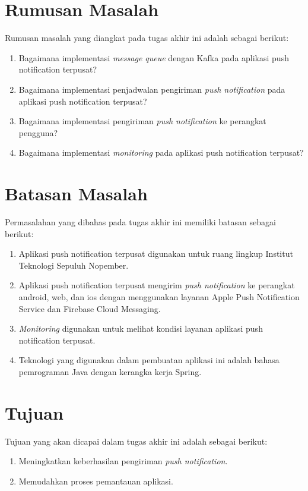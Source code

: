 \section {Rumusan Masalah}
Rumusan masalah yang diangkat pada tugas akhir ini adalah sebagai berikut:
\begin {enumerate}
\item Bagaimana implementasi \textit{message queue} dengan Kafka pada aplikasi push notification terpusat?
\item Bagaimana implementasi penjadwalan pengiriman \textit{push notification} pada aplikasi push notification terpusat?
\item Bagaimana implementasi pengiriman \textit{push notification} ke perangkat pengguna?
\item Bagaimana implementasi \textit{monitoring} pada aplikasi push notification terpusat?
\end {enumerate}

\section {Batasan Masalah}
Permasalahan yang dibahas pada tugas akhir ini memiliki batasan sebagai berikut:
\begin {enumerate}
\item Aplikasi push notification terpusat digunakan untuk ruang lingkup Institut Teknologi Sepuluh Nopember.
\item Aplikasi push notification terpusat mengirim \textit{push notification} ke perangkat android, web, dan ios dengan menggunakan layanan Apple Push Notification Service dan Firebase Cloud Messaging.
\item \textit{Monitoring} digunakan untuk melihat kondisi layanan aplikasi push notification terpusat.
\item Teknologi yang digunakan dalam pembuatan aplikasi ini adalah bahasa pemrograman Java dengan kerangka kerja Spring.
\end {enumerate}

\section {Tujuan}
Tujuan yang akan dicapai dalam tugas akhir ini adalah sebagai berikut:
\begin{enumerate}
	\item Meningkatkan keberhasilan pengiriman \textit{push notification}.
	\item Memudahkan proses pemantauan aplikasi.
\end{enumerate}

